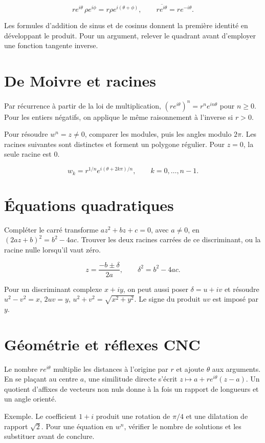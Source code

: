 \documentclass[11pt,a4paper]{article}
\begin{document}
\[ re^{i\theta}\,\rho e^{i\phi}=r\rho e^{i(\theta+\phi)},\qquad \overline{re^{i\theta}}=re^{-i\theta}. \]

Les formules d’addition de sinus et de cosinus donnent la première identité en développant le produit. Pour un argument, relever le quadrant avant d’employer une fonction tangente inverse.

\section*{De Moivre et racines}
Par récurrence à partir de la loi de multiplication, $(re^{i\theta})^n=r^ne^{in\theta}$ pour $n\ge0$. Pour les entiers négatifs, on applique le même raisonnement à l’inverse si $r>0$.

Pour résoudre $w^n=z\ne0$, comparer les modules, puis les angles modulo $2\pi$. Les racines suivantes sont distinctes et forment un polygone régulier. Pour $z=0$, la seule racine est $0$.

\[ w_k=r^{1/n}e^{i(\theta+2k\pi)/n},\qquad k=0,\ldots,n-1. \]

\section*{Équations quadratiques}
Compléter le carré transforme $az^2+bz+c=0$, avec $a\ne0$, en $(2az+b)^2=b^2-4ac$. Trouver les deux racines carrées de ce discriminant, ou la racine nulle lorsqu’il vaut zéro.

\[ z=\frac{-b\pm\delta}{2a},\qquad \delta^2=b^2-4ac. \]

Pour un discriminant complexe $x+iy$, on peut aussi poser $\delta=u+iv$ et résoudre $u^2-v^2=x$, $2uv=y$, $u^2+v^2=\sqrt{x^2+y^2}$. Le signe du produit $uv$ est imposé par $y$.

\section*{Géométrie et réflexes CNC}
Le nombre $re^{i\theta}$ multiplie les distances à l’origine par $r$ et ajoute $\theta$ aux arguments. En se plaçant au centre $a$, une similitude directe s’écrit $z\mapsto a+re^{i\theta}(z-a)$. Un quotient d’affixes de vecteurs non nuls donne à la fois un rapport de longueurs et un angle orienté.

Exemple. Le coefficient $1+i$ produit une rotation de $\pi/4$ et une dilatation de rapport $\sqrt2$. Pour une équation en $w^n$, vérifier le nombre de solutions et les substituer avant de conclure.
\end{document}
